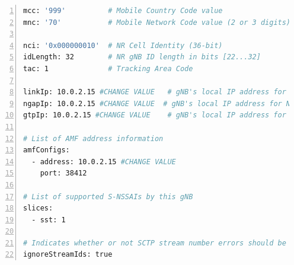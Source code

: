 \begin{lstlisting}[basicstyle=\small, frame=single, breaklines=true, postbreak=\mbox{\textcolor{red}{$\hookrightarrow$}\space}, escapeinside ={\%,}, escapechar={!}, numbers=left, language=sh, caption=gnb configuratie]
mcc: '999'          # Mobile Country Code value
mnc: '70'           # Mobile Network Code value (2 or 3 digits)

nci: '0x000000010'  # NR Cell Identity (36-bit)
idLength: 32        # NR gNB ID length in bits [22...32]
tac: 1              # Tracking Area Code

linkIp: 10.0.2.15 #CHANGE VALUE   # gNB's local IP address for Radio Link Simulation (Usually same with local IP)
ngapIp: 10.0.2.15 #CHANGE VALUE  # gNB's local IP address for N2 Interface (Usually same with local IP)
gtpIp: 10.0.2.15 #CHANGE VALUE    # gNB's local IP address for N3 Interface (Usually same with local IP)

# List of AMF address information
amfConfigs:
  - address: 10.0.2.15 #CHANGE VALUE
    port: 38412

# List of supported S-NSSAIs by this gNB
slices:
  - sst: 1

# Indicates whether or not SCTP stream number errors should be ignored.
ignoreStreamIds: true
\end{lstlisting}

\subsection{}%
\label{sec:ue_config}%

